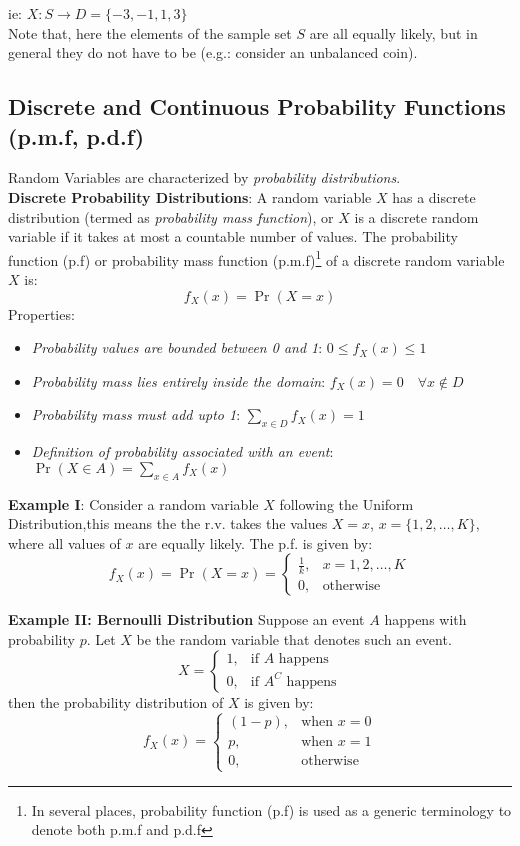\documentclass[english, 11pt]{article}
\begin{document}
ie: $X : S \rightarrow D = \{ -3, -1, 1, 3 \}$ \\
Note that, here the elements of the sample set $S$ are all equally likely, but in general they do not have to be (e.g.: consider an unbalanced coin).

\subsection{Discrete and Continuous Probability Functions (p.m.f, p.d.f)}
Random Variables are characterized by {\it probability distributions}. \\

{\bf Discrete Probability Distributions}: A random variable $X$ has a discrete distribution (termed as {\it probability mass function}), or $X$ is a discrete random variable if it takes at most a countable number of values. The probability function (p.f) or probability mass function (p.m.f)\footnote{In several places, probability function (p.f) is used as a generic terminology to denote both p.m.f and p.d.f} of a discrete random variable $X$ is:
\[ f_{X} (x) = \Pr(X=x) \]
Properties:
\begin{itemize}
\item {\it Probability values are bounded between 0 and 1}: \hfill $0 \le f_X (x) \le 1$
\item {\it Probability mass lies entirely inside the domain}: \hfill $f_X (x) = 0 \quad \forall x \notin D$
\item {\it Probability mass must add upto 1}: \hfill $\sum_{x \in D} f_X (x) = 1$
\item {\it Definition of probability associated with an event}: \hfill $\Pr(X \in A) = \sum_{x \in A} f_X (x)$
\end{itemize}

{\bf Example I}: Consider a random variable $X$ following the Uniform Distribution,this means the the r.v. takes the values $X=x$, $x = \{ 1, 2, \ldots, K \}$, where all values of $x$ are equally likely. The p.f. is given by:
\[
   f_X (x) = \Pr(X = x) =  
\begin{cases}
    \frac{1}{k}, & x=1, 2, \ldots, K \\
    0,              & \text{otherwise}
\end{cases}
\]

{\bf Example II: Bernoulli Distribution} Suppose an event $A$ happens with probability $p$. Let $X$ be the random variable that denotes such an event.
\[ X = 
\begin{cases}
  1, & \text{if $A$ happens} \\
  0, & \text{if $A^C$ happens}
\end{cases}
\]
then the probability distribution of $X$ is given by:
\[
   f_X (x) =
\begin{cases}
    (1-p), & \text{when $x=0$} \\
    p,     &  \text{when $x=1$} \\
    0,      & \text{otherwise}
\end{cases}
\]
\end{document}
